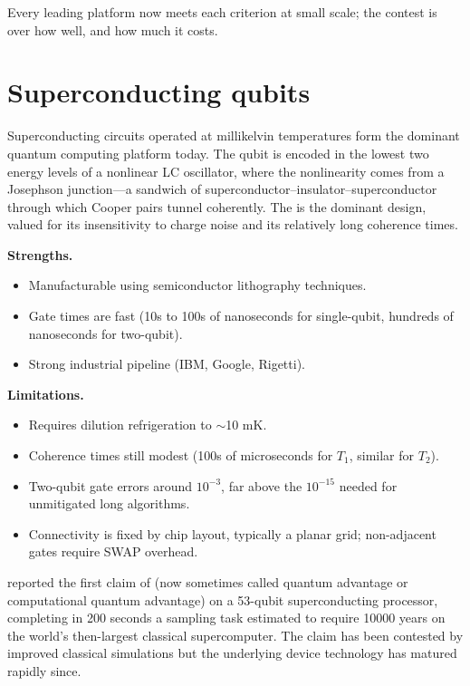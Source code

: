 Every leading platform now meets each criterion at small scale; the contest is over how well, and how much it costs.

\section{Superconducting qubits}

Superconducting circuits operated at millikelvin temperatures form the dominant quantum computing platform today. The qubit is encoded in the lowest two energy levels of a nonlinear LC oscillator, where the nonlinearity comes from a Josephson junction---a sandwich of superconductor--insulator--superconductor through which Cooper pairs tunnel coherently. The  \citep{koch_charge-insensitive_2007} is the dominant design, valued for its insensitivity to charge noise and its relatively long coherence times.

\textbf{Strengths.}
\begin{itemize}
\item Manufacturable using semiconductor lithography techniques.
\item Gate times are fast (10s to 100s of nanoseconds for single-qubit, hundreds of nanoseconds for two-qubit).
\item Strong industrial pipeline (IBM, Google, Rigetti).
\end{itemize}

\textbf{Limitations.}
\begin{itemize}
\item Requires dilution refrigeration to $\sim$10 mK.
\item Coherence times still modest (100s of microseconds for $T_1$, similar for $T_2$).
\item Two-qubit gate errors around $10^{-3}$, far above the $10^{-15}$ needed for unmitigated long algorithms.
\item Connectivity is fixed by chip layout, typically a planar grid; non-adjacent gates require SWAP overhead.
\end{itemize}

\citet{arute_quantum_2019} reported the first claim of  (now sometimes called quantum advantage or computational quantum advantage) on a 53-qubit superconducting processor, completing in 200 seconds a sampling task estimated to require 10000 years on the world's then-largest classical supercomputer. The claim has been contested by improved classical simulations but the underlying device technology has matured rapidly since.

